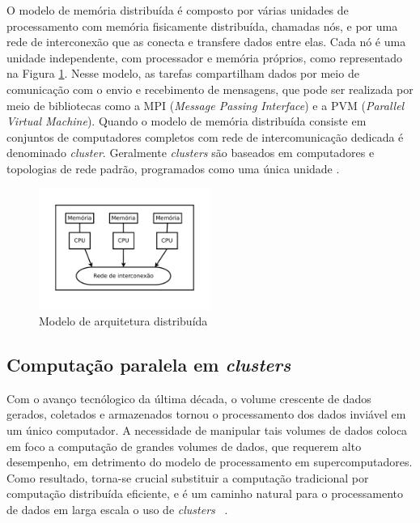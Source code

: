 O modelo de memória distribuída é composto por várias unidades de processamento  com memória fisicamente distribuída, chamadas nós, e por uma rede de interconexão que as conecta e transfere dados entre elas. 
Cada nó é uma unidade independente, com processador e memória próprios, como representado na Figura \ref{fig:ArquiteturaDistribuida}.
Nesse modelo, as tarefas compartilham dados por meio de comunicação com o envio e recebimento de mensagens, que pode ser realizada por meio de bibliotecas como a MPI (\textit{Message Passing Interface}) e a PVM (\textit{Parallel Virtual Machine}).
Quando o modelo de memória distribuída consiste em conjuntos de computadores completos com rede de intercomunicação dedicada é denominado \textit{cluster}. Geralmente \textit{clusters} são baseados em computadores e topologias de rede padrão, programados como uma única unidade \cite{Rauber:2010}.


\begin{figure}[htb]
\centering
\includegraphics[trim=0cm 1cm 0cm 0cm, width=0.5\textwidth]{figuras/Arquitetura.pdf}
\caption{Modelo de arquitetura distribuída}
\label{fig:ArquiteturaDistribuida}
\end{figure}


\subsection{Computação paralela em \textit{clusters}}
Com o avanço tecnólogico da última década, o volume crescente de dados gerados, coletados e armazenados tornou o processamento dos dados inviável em um único computador.
A necessidade de manipular tais volumes de dados coloca em foco a computação de grandes volumes de dados, que requerem alto desempenho, em detrimento do modelo de processamento em supercomputadores.  Como resultado, torna-se crucial substituir a computação tradicional por computação distribuída eficiente, e é um caminho natural para o processamento de dados em larga escala o uso de \textit{clusters} ~\cite{Lin:2010}.


